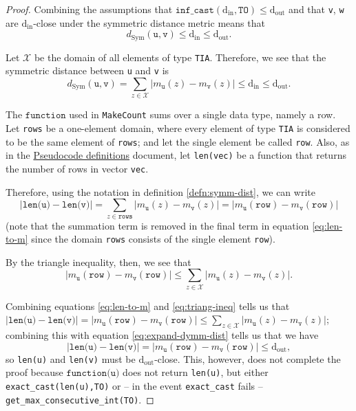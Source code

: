 \documentclass[12pt,letterpaper]{article}
\newcommand{\din}{\mathrm{d_{in}}}
\newcommand{\dout}{\mathrm{d_{out}}}
\newcommand{\function}{\texttt{function}}
\theoremstyle{definition}
\begin{document}
\begin{proof}
Combining the assumptions that $\texttt{inf\_cast}(\din, \texttt{TO}) \leq \dout$ and that \texttt{v}, \texttt{w} are $\din$-close under the symmetric distance metric means that
\begin{equation}
    d_\text{Sym}(\texttt{u}, \texttt{v})
    \leq \din \leq \dout.
\end{equation}

Let $\mathcal{X}$ be the domain of all elements of type \texttt{TIA}. Therefore, we see that the symmetric distance  between \texttt{u} and \texttt{v} is 
\begin{equation}
\label{eq:expand-dymm-dist}
    d_\text{Sym}(\texttt{u}, \texttt{v}) = \sum_{z\in \mathcal{X}} |m_{\texttt{u}}(z) - m_{\texttt{v}}(z)| \leq \din \leq \dout.
\end{equation}

The $\function$ used in \texttt{MakeCount} sums over a single data type, namely a row. Let \texttt{rows} be a one-element domain, where every element of type \texttt{TIA} is considered to be the same element of \texttt{rows}; and let the single element be called \texttt{row}. Also, as in the \href{https://www.overleaf.com/project/60d215bf90b337ac02200a99}{Pseudocode definitions} document, let \texttt{len(vec)} be a function that returns the number of rows in vector \texttt{vec}.

Therefore, using the notation in definition \ref{defn:symm-dist}, we can write
\begin{equation}
\label{eq:len-to-m}
    |\texttt{len(u)} - \texttt{len(v)}| = \sum_{z\in \texttt{rows}}|m_{\texttt{u}}(z) - m_{\texttt{v}}(z)| = |m_{\texttt{u}}(\texttt{row}) - m_{\texttt{v}}(\texttt{row})|
\end{equation}
(note that the summation term is removed in the final term in equation \ref{eq:len-to-m} since the domain \texttt{rows} consists of the single element \texttt{row}).

By the triangle inequality, then, we see that
\begin{equation}
\label{eq:triang-ineq}
    |m_{\texttt{u}}(\texttt{row}) - m_{\texttt{v}}(\texttt{row})| \leq \sum_{z\in \mathcal{X}} |m_{\texttt{u}}(z) - m_{\texttt{v}}(z)|.
\end{equation}

Combining equations \ref{eq:len-to-m} and \ref{eq:triang-ineq} tells us that $|\texttt{len(u)} - \texttt{len(v)}| = |m_{\texttt{u}}(\texttt{row}) - m_{\texttt{v}}(\texttt{row})| \leq \sum_{z\in \mathcal{X}} |m_{\texttt{u}}(z) - m_{\texttt{v}}(z)|$; combining this with equation \ref{eq:expand-dymm-dist} tells us that we have
\begin{equation}
\label{eq:lens-dout-close}
    |\texttt{len(u)} - \texttt{len(v)}| = |m_{\texttt{u}}(\texttt{row}) - m_{\texttt{v}}(\texttt{row})| \leq \dout,
\end{equation}
so \texttt{len(u)} and \texttt{len(v)} must be $\dout$-close. This, however, does not complete the proof because $\texttt{function(u)}$ does not return \texttt{len(u)}, but either \texttt{exact\_cast(len(u),TO)} or -- in the event \texttt{exact\_cast} fails -- \texttt{get\_max\_consecutive\_int(TO)}.


\end{proof}
\end{document}
